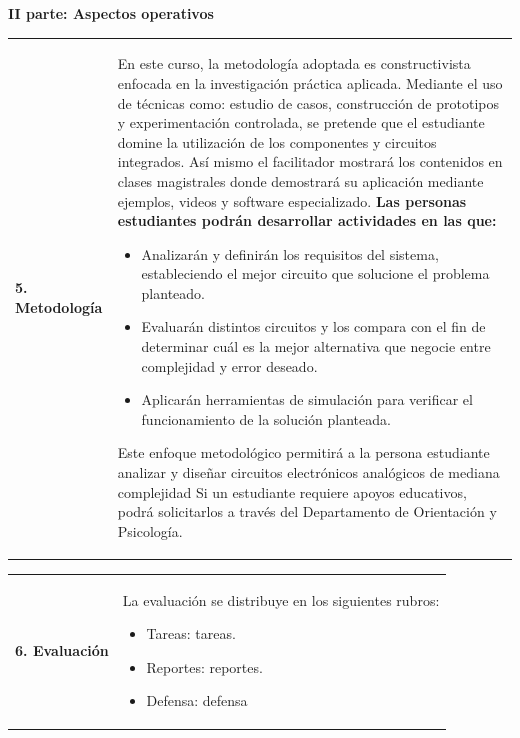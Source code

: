 \documentclass[letterpaper]{article}%
\begin{document}
\newpage%
\par\fontsize{14}{0}\selectfont \textbf{\textcolor{parte}{II parte: Aspectos operativos}}%
\vspace*{4mm}%
\newline%
\fontsize{10}{12}\selectfont %
\begin{tabularx}{\textwidth}{p{3cm}p{13cm}}%
\par\fontsize{12}{14}\selectfont \textbf{\textcolor{parte}{5. Metodología}}&En este curso, la metodología adoptada es constructivista enfocada en la investigación práctica aplicada. Mediante el uso de técnicas como:  estudio de casos, construcción de prototipos y experimentación controlada, se pretende que el estudiante domine la utilización de los componentes y circuitos integrados. Así mismo el facilitador mostrará los contenidos en clases magistrales donde demostrará su aplicación mediante ejemplos, videos y software especializado. \newline\newline \textbf{Las personas estudiantes podrán desarrollar actividades en las que:} \newline\begin{itemize}\item Analizarán y definirán los requisitos del sistema, estableciendo el mejor circuito que solucione el problema planteado.\item Evaluarán distintos circuitos y los compara con el fin de determinar cuál es la mejor alternativa que negocie entre complejidad y error deseado.\item Aplicarán herramientas de simulación para verificar el funcionamiento de la solución planteada.\end{itemize}\vspace*{2mm}Este enfoque metodológico permitirá a la persona estudiante analizar y diseñar circuitos electrónicos analógicos de mediana complejidad\vspace*{2mm} \newline  Si un estudiante requiere apoyos educativos, podrá solicitarlos a través del Departamento de Orientación y Psicología. \newline \\%
\end{tabularx}%
\vspace*{2mm}%
\newline%
\begin{tabularx}{\textwidth}{p{3cm}p{13cm}}%
\par\fontsize{12}{14}\selectfont \textbf{\textcolor{parte}{6. Evaluación}}&La evaluación se distribuye en los siguientes rubros: \newline \begin{itemize} \item Tareas: tareas. \item Reportes: reportes. \item Defensa: defensa \end{itemize}\\%
\end{tabularx}%
\end{document}
